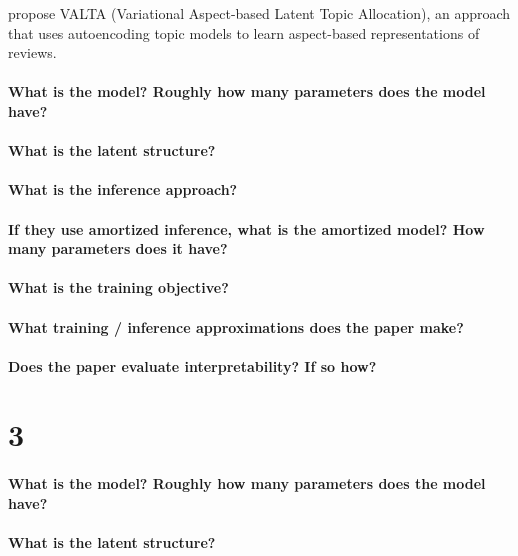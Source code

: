 \documentclass[11pt]{article}
\begin{document}
\cite{esmaeili2018structured} propose VALTA (Variational Aspect-based Latent Topic Allocation), an approach that uses autoencoding topic models to learn aspect-based representations of reviews.

\paragraph{What is the model? Roughly how many parameters does the model have?} 

\paragraph{What is the latent structure?}

\paragraph{What is the inference approach?}

\paragraph{If they use amortized inference, what is the amortized model? How many parameters does it have?}

\paragraph{What is the training objective?}

\paragraph{What training / inference approximations does the paper make?}

\paragraph{Does the paper evaluate interpretability? If so how?}

\section{3}

\paragraph{What is the model? Roughly how many parameters does the model have?}

\paragraph{What is the latent structure?}
\end{document}
